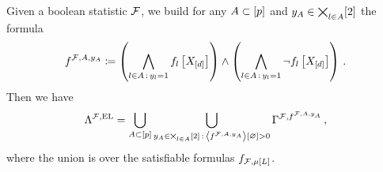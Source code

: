\begin{theorem}
    Given a boolean statistic $\mathcal{F}$, we build for any $A\subset[p]$ and $y_{A}\in\bigtimes_{l\in A}[2]$ the formula
    \begin{align*}
        f^{\mathcal{F},A,y_{A}} \coloneqq
        \left(\bigwedge_{l\in A\,:\,y_{l}=1} f_{l}\left[X_{[d]}\right]\right)
        \land
        \left(\bigwedge_{l\in A\,:\,y_{l}=1} \lnot f_{l}\left[X_{[d]}\right]\right) \, .
    \end{align*}
    Then we have
    \begin{align*}
        \Lambda^{\mathcal{F},\mathrm{EL}}
        = \bigcup_{A\subset[p]} \bigcup_{y_{A}\in\bigtimes_{l\in A}[2]\,:\,\left\langle f^{\mathcal{F},A,y_{A}}\right\rangle \left[ \varnothing \right]>0} \Gamma^{\mathcal{F},f^{\mathcal{F},A,y_{A}}} \, ,
    \end{align*}
    where the union is over the satisfiable formulas $f_{\mathcal{F},\mu\left[L\right]}$.
\end{theorem}
